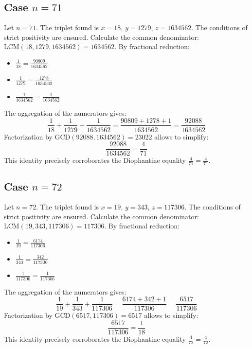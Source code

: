\documentclass[11pt,a4paper]{article}
\begin{document}
\subsection{Case $n = 71$}
Let $n = 71$. The triplet found is $x = 18$, $y = 1279$, $z = 1634562$.
The conditions of strict positivity are ensured.
Calculate the common denominator: $\text{LCM}(18, 1279, 1634562) = 1634562$.
By fractional reduction:
\begin{itemize}
    \item $\frac{1}{18} = \frac{90809}{1634562}$
    \item $\frac{1}{1279} = \frac{1278}{1634562}$
    \item $\frac{1}{1634562} = \frac{1}{1634562}$
\end{itemize}
The aggregation of the numerators gives:
$$ \frac{1}{18} + \frac{1}{1279} + \frac{1}{1634562} = \frac{90809 + 1278 + 1}{1634562} = \frac{92088}{1634562} $$
Factorization by $\text{GCD}(92088, 1634562) = 23022$ allows to simplify:
$$ \frac{92088}{1634562} = \frac{4}{71} $$
This identity precisely corroborates the Diophantine equality $\frac{4}{71} = \frac{4}{71}$.

\subsection{Case $n = 72$}
Let $n = 72$. The triplet found is $x = 19$, $y = 343$, $z = 117306$.
The conditions of strict positivity are ensured.
Calculate the common denominator: $\text{LCM}(19, 343, 117306) = 117306$.
By fractional reduction:
\begin{itemize}
    \item $\frac{1}{19} = \frac{6174}{117306}$
    \item $\frac{1}{343} = \frac{342}{117306}$
    \item $\frac{1}{117306} = \frac{1}{117306}$
\end{itemize}
The aggregation of the numerators gives:
$$ \frac{1}{19} + \frac{1}{343} + \frac{1}{117306} = \frac{6174 + 342 + 1}{117306} = \frac{6517}{117306} $$
Factorization by $\text{GCD}(6517, 117306) = 6517$ allows to simplify:
$$ \frac{6517}{117306} = \frac{1}{18} $$
This identity precisely corroborates the Diophantine equality $\frac{4}{72} = \frac{4}{72}$.
\end{document}
